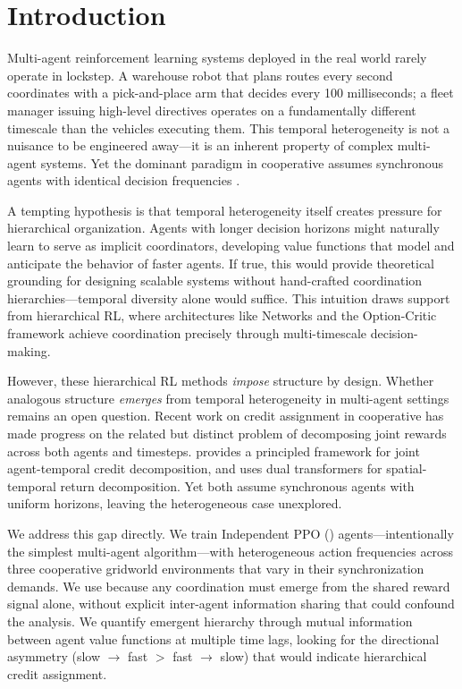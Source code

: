 \section{Introduction}
\label{sec:intro}

Multi-agent reinforcement learning systems deployed in the real world rarely operate in lockstep. A warehouse robot that plans routes every second coordinates with a pick-and-place arm that decides every 100 milliseconds; a fleet manager issuing high-level directives operates on a fundamentally different timescale than the vehicles executing them. This temporal heterogeneity is not a nuisance to be engineered away---it is an inherent property of complex multi-agent systems. Yet the dominant paradigm in cooperative \marl assumes synchronous agents with identical decision frequencies \citep{rashid2018qmix, yu2022mappo, foerster2018coma}.

A tempting hypothesis is that temporal heterogeneity itself creates pressure for hierarchical organization. Agents with longer decision horizons might naturally learn to serve as implicit coordinators, developing value functions that model and anticipate the behavior of faster agents. If true, this would provide theoretical grounding for designing scalable \marl systems without hand-crafted coordination hierarchies---temporal diversity alone would suffice. This intuition draws support from hierarchical RL, where architectures like \feudal Networks \citep{vezhnevets2017feudal} and the Option-Critic framework \citep{bacon2017option} achieve coordination precisely through multi-timescale decision-making.

However, these hierarchical RL methods \emph{impose} structure by design. Whether analogous structure \emph{emerges} from temporal heterogeneity in multi-agent settings remains an open question. Recent work on credit assignment in cooperative \marl has made progress on the related but distinct problem of decomposing joint rewards across both agents and timesteps. \tartwo \citep{kapoor2024tar2} provides a principled framework for joint agent-temporal credit decomposition, and \stas \citep{chen2024stas} uses dual transformers for spatial-temporal return decomposition. Yet both assume synchronous agents with uniform horizons, leaving the heterogeneous case unexplored.

We address this gap directly. We train Independent PPO (\ippo) agents---intentionally the simplest multi-agent algorithm---with heterogeneous action frequencies across three cooperative gridworld environments that vary in their synchronization demands. We use \ippo because any coordination must emerge from the shared reward signal alone, without explicit inter-agent information sharing that could confound the analysis. We quantify emergent hierarchy through mutual information between agent value functions at multiple time lags, looking for the directional asymmetry (slow $\to$ fast $>$ fast $\to$ slow) that would indicate hierarchical credit assignment.

